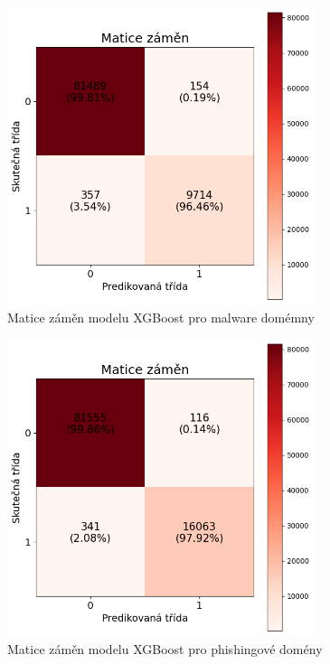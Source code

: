 \begin{figure}[H]
    \centering
    \includegraphics[width=0.8\textwidth]{obrazky-figures/XgBoost_stage_3_malware_v1.1_confusion_matrix.png}
    \caption{Matice záměn modelu XGBoost pro malware domémny}
    \label{fig:xgboost_conf_matrix_malware}
\end{figure}

\begin{figure}[H]
    \centering
    \includegraphics[width=0.8\textwidth]{obrazky-figures/XgBoost_stage_3_phishing_v1.1_confusion_matrix.png}
    \caption{Matice záměn modelu XGBoost pro phishingové domény}
    \label{fig:xgboost_conf_matrix_phishing}
\end{figure}


